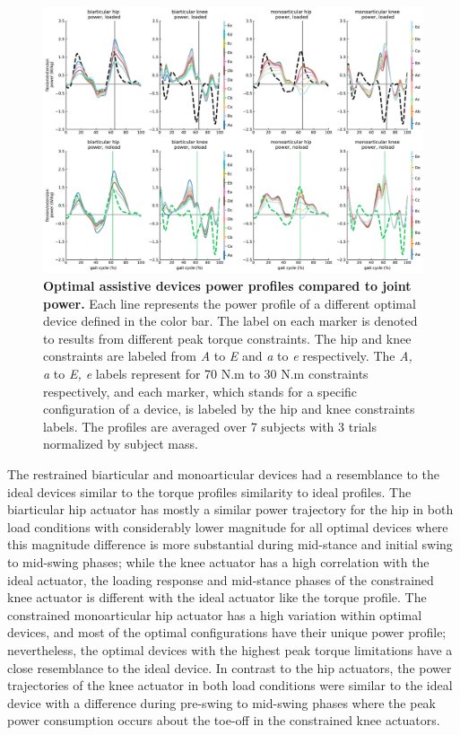 \documentclass[10pt,letterpaper]{article}
\begin{document}
\begin{figure}[ht]   
	\centering
	\includegraphics[width=\linewidth]{Pareto_Simulations_Figures/PaperFigure_Paretofront_PowerProfiles.pdf}
	\vspace{1mm}
		\caption{{\small\textbf{Optimal assistive devices power profiles compared to joint power.} Each line represents the power profile of a different optimal device defined in the color bar. The label on each marker is denoted to results from different peak torque constraints. The hip and knee constraints are labeled from {\it A} to {\it E} and {\it a} to {\it e} respectively. The {\it A, a} to {\it E, e} labels represent for 70 N.m to 30 N.m constraints respectively, and each marker, which stands for a specific configuration of a device, is labeled by the hip and knee constraints labels. The profiles are averaged over 7 subjects with 3 trials normalized by subject mass.}}
	\label{Fig_Paretofronts_Power_Profiles}
\end{figure}
\vspace{2mm}
The restrained biarticular and monoarticular devices had a resemblance to the ideal devices similar to the torque profiles similarity to ideal profiles. The biarticular hip actuator has mostly a similar power trajectory for the hip in both load conditions with considerably lower magnitude for all optimal devices where this magnitude difference is more substantial during mid-stance and initial swing to mid-swing phases; while the knee actuator has a high correlation with the ideal actuator, the loading response and mid-stance phases of the constrained knee actuator is different with the ideal actuator like the torque profile. The constrained monoarticular hip actuator has a high variation within optimal devices, and most of the optimal configurations have their unique power profile; nevertheless, the optimal devices with the highest peak torque limitations have a close resemblance to the ideal device. In contrast to the hip actuators, the power trajectories of the knee actuator in both load conditions were similar to the ideal device with a difference during pre-swing to mid-swing phases where the peak power consumption occurs about the toe-off in the constrained knee actuators.\\
\end{document}
